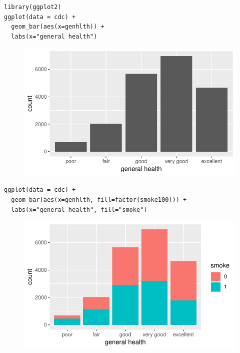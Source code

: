 \documentclass[10pt]{beamer}
\begin{document}
\begin{frame}[fragile]
\begin{verbatim}
library(ggplot2)
ggplot(data = cdc) + 
  geom_bar(aes(x=genhlth)) +
  labs(x="general health")
\end{verbatim}
\begin{figure}[htbp]
\centering
\includegraphics[scale=0.6]{figure/barplot_hlth_gg.pdf}
\end{figure}
\end{frame}

\begin{frame}[fragile]
\begin{verbatim}
ggplot(data = cdc) + 
  geom_bar(aes(x=genhlth, fill=factor(smoke100))) + 
  labs(x="general health", fill="smoke")
\end{verbatim}
\begin{figure}[htbp]
\centering
\includegraphics[scale=0.6]{figure/barplot_stack_hlthsmoke_gg.pdf}
\end{figure}
\end{frame}
\end{document}
